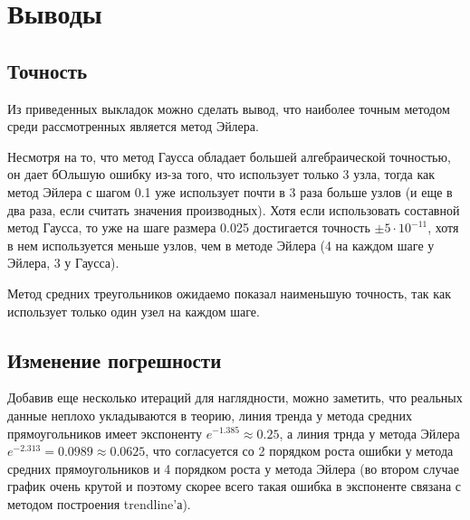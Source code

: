 \documentclass[11pt,a4paper,oneside]{article}
\begin{document}
\section{Выводы}

\subsection{Точность}

Из приведенных выкладок можно сделать вывод, что наиболее точным методом среди рассмотренных является метод Эйлера.

Несмотря на то, что метод Гаусса обладает большей алгебраической точностью, он дает бОльшую ошибку из-за того, что использует только 3 узла, тогда как метод Эйлера с шагом 0.1 уже использует почти в 3 раза больше узлов (и еще в два раза, если считать значения производных). Хотя если использовать составной метод Гаусса, то уже на шаге размера 0.025 достигается точность $\pm 5 \cdot 10^{-11}$, хотя в нем используется меньше узлов, чем в методе Эйлера (4 на каждом шаге у Эйлера, 3 у Гаусса).

Метод средних треугольников ожидаемо показал наименьшую точность, так как использует только один узел на каждом шаге.

\subsection{Изменение погрешности}

Добавив еще несколько итераций для наглядности, можно заметить, что реальных данные неплохо укладываются в теорию, линия тренда у метода средних прямоугольников имеет экспоненту $e^{-1.385} \approx 0.25$, а линия трнда у метода Эйлера $e^{-2.313} = 0.0989 \approx 0.0625$, что согласуется со 2 порядком роста ошибки у метода средних прямоугольников и 4 порядком роста у метода Эйлера (во втором случае график очень крутой и поэтому скорее всего такая ошибка в экспоненте связана с методом построения trendline'а).
\end{document}
